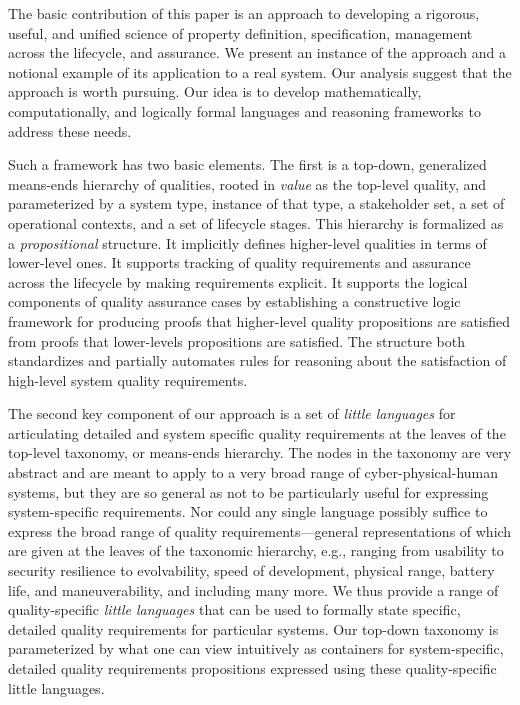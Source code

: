\documentclass[conference]{IEEEtran}
\begin{document}
The basic contribution of this paper is an approach to developing a rigorous, useful, and unified science of property definition, specification, management across the lifecycle, and assurance. We present an instance of the approach and a notional example of its application to a real system. Our analysis suggest that the approach is worth pursuing. Our idea is to develop mathematically, computationally, and logically formal languages and reasoning frameworks to address these needs. 

Such a framework has two basic elements. The first is a top-down, generalized means-ends hierarchy of qualities, rooted in {\em value} as the top-level quality, and parameterized by a system type, instance of that type, a stakeholder set, a set of operational contexts, and a set of lifecycle stages. This hierarchy is formalized as a {\em propositional} structure. It implicitly defines higher-level qualities in terms of lower-level ones. It supports tracking of quality requirements and assurance across the lifecycle by making requirements explicit. It supports the logical components of quality assurance cases by establishing a constructive logic framework for producing proofs that higher-level quality propositions are satisfied from proofs that lower-levels propositions are satisfied. The structure both standardizes and partially automates rules for reasoning about the satisfaction of high-level system quality requirements. 

The second key component of our approach is a set of {\em little languages} for articulating detailed and system specific quality requirements at the leaves of the top-level taxonomy, or means-ends hierarchy. The nodes in the taxonomy are very abstract and are meant to apply to a very broad range of cyber-physical-human systems, but they are so general as not to be particularly useful for expressing system-specific requirements. Nor could any single language possibly suffice to express the broad range of quality requirements---general representations of which are given at the leaves of the taxonomic hierarchy, e.g., ranging from usability to security resilience to evolvability, speed of development, physical range, battery life, and maneuverability, and including many more. We thus provide a range of quality-specific {\em little languages} that can be used to formally state specific, detailed quality requirements for particular systems. Our top-down taxonomy is parameterized by what one can view intuitively as containers for system-specific, detailed quality requirements propositions expressed using these quality-specific little languages. 
\end{document}
